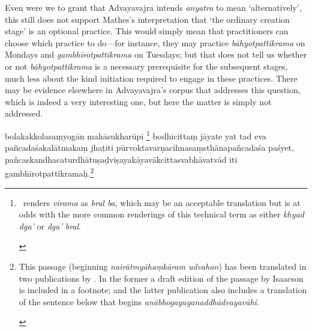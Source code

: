 \documentclass[naipra.tex]{subfiles}
\begin{document}
\begin{sanskrit}
{\begin{english}
		Even were we to grant that Advayavajra intends \emph{anyatra} to mean `alternatively', this still does not support Mathes's interpretation that `the ordinary creation stage' is an optional practice.
		This would simply mean that practitioners can choose which practice to do—for instance, they may practice \emph{bāhyotpattikrama} on Mondays and \emph{gambhīrotpattikrama} on Tuesdays; but that does not tell us whether or not \emph{bāhyotpattikrama} is a necessary prerequisite for the subsequent stages, much less about the kind initiation required to engage in these practices.
		There may be evidence elsewhere in Advayavajra's corpus that addresses this question, which is indeed a very interesting one, but here the matter is simply not addressed.
	\end{english}
} bolakakkolasaṃyogān mahāsukharūpi \footnote{
	\begin{english}%
		\TIB\ renders \emph{virama} as \emph{bral ba}, which may be an acceptable translation but is at odds with the more common renderings of this technical term as either \emph{khyad dga'} or \emph{dga' bral}.
	\end{english}
} bodhicittaṃ jāyate yat tad eva pañcadaśakalātmakaṃ jhaṭiti pūrvoktavarṇacihnasaṃsthānapañcadaśa paśyet,  pañcaskandhacaturdhātuṣaḍviṣayakāyavākcittasvabhāvatvād iti gambhīrotpattikramaḥ.\footnote{
	\begin{english}%
		This passage (beginning \emph{nairātmyāhaṃkāram udvahan}) has been translated in two publications by \textcites[373–4]{mathes2014}[132-3]{mathes2021}.
		In the former a draft edition of the passage by \textsf{Isaacson} is included in a footnote; and the latter publication also includes a translation of the sentence below that begins \emph{anābhogayuganaddhādvayavāhi}.
	\end{english}
}
\pend 




\end{sanskrit}
\end{document}
